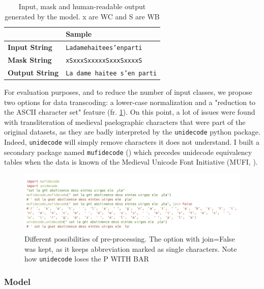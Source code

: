 \documentclass{jdmdh}
\begin{document}
\begin{table}[!ht]
\centering
\begin{tabular}{@{}ll@{}}
\hline
                       & \textbf{Sample}           \\  \hline
\textbf{Input  String} & \texttt{Ladamehaitees'enparti}     \\
\textbf{Mask   String} & \texttt{xSxxxSxxxxxSxxxSxxxxS}     \\
\textbf{Output String} & \texttt{La dame haitee s'en parti} \\ \hline
\end{tabular}
  \caption{Input, mask and human-readable output generated by the model. x are WC and S are WB}
  \label{lst:input_output_example}
\end{table}

For evaluation purposes, and to reduce the number of input classes, we propose two options for data transcoding: a lower-case normalization and a "reduction to the ASCII character set" feature (fr. \ref{fig:normalization}). On this point, a lot of issues were found with transliteration of medieval paelographic characters that were part of the original datasets, as they are badly interpreted by the \texttt{unidecode} python package. Indeed, \texttt{unidecode} will simply remove characters it does not understand. I built a secondary package named \texttt{mufidecode} (\citet{thibault_clerice_2019_3237731}) which precedes unidecode equivalency tables when the data is known of the Medieval Unicode Font Initiative (MUFI, \citet{mufi}).

\begin{figure}[!ht]
  \centering
  \includegraphics[width=\linewidth]{carbon.png}
  \caption{Different possibilities of pre-processing. The option with join=False was kept, as it keeps abbreviation marked as single characters. Note how \texttt{unidecode} loses the P WITH BAR}
  \label{fig:normalization}
\end{figure}

\subsubsection{Model}
\end{document}
